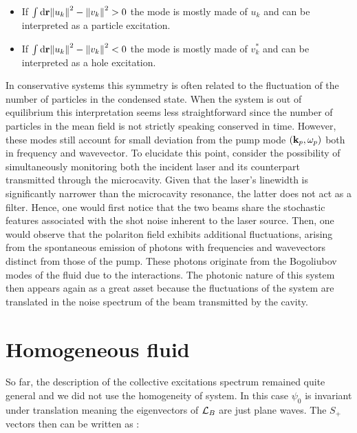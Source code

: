 \begin{itemize}
    \item If $\int \mathrm{d}\mathbf{r}\norm{u_k}^2-\norm{v_k}^2>0$ the mode is mostly made of $u_k$ and can be interpreted as a particle excitation.
    \item If $\int \mathrm{d}\mathbf{r}\norm{u_k}^2-\norm{v_k}^2<0$ the mode is mostly made of $v_k^*$ and can be interpreted as a hole excitation.
\end{itemize}

In conservative systems this symmetry is often related to the fluctuation of the number of particles in the condensed state. When the system is out of equilibrium 
this interpretation seems less straightforward since the number of particles in the mean field is not strictly speaking conserved in time. However, these 
modes still account for small deviation from the pump mode $(\mathbf{k}_p,\omega_p)$ both in frequency and wavevector. To elucidate this point, consider the possibility of simultaneously monitoring both the incident laser and its counterpart transmitted through the microcavity.
 Given that the laser's linewidth is significantly narrower than the microcavity resonance, the latter does not act as a filter. Hence, one would first notice that the two beams share the stochastic features associated with the shot noise inherent to the laser source.
 Then, one would observe that the polariton field exhibits additional fluctuations, arising from the spontaneous emission of photons with frequencies and wavevectors distinct from those of the pump.
These photons originate from the Bogoliubov modes of the fluid due to the interactions. The photonic nature of this system then appears again as a great asset because the fluctuations of the system
are translated in the noise spectrum of the beam transmitted by the cavity. 


\section{Homogeneous fluid}

So far, the description of the collective excitations spectrum remained quite general and we did not use the homogeneity of system.
In this case $\psi_0$ is invariant under translation meaning the eigenvectors of $\mathcal{L}_B$ are just plane waves. The $S_+$ vectors then can be written as :

